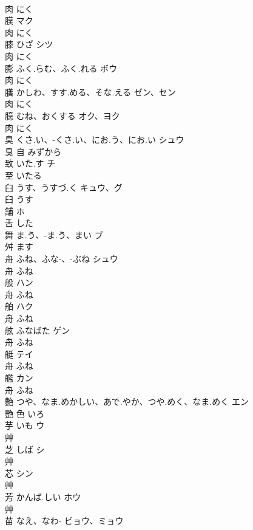 \documentclass[8pt]{extreport}
\begin{document}
\begin{CJK}{UTF8}{min}
\\	肉		にく		
\\	膜		マク	
\\	肉		にく		
\\	膝	ひざ	シツ	
\\	肉		にく		
\\	膨	ふく.らむ、ふく.れる	ボウ	
\\	肉		にく		
\\	膳	かしわ、すす.める、そな.える	ゼン、セン	
\\	肉		にく		
\\	臆	むね、おくする	オク、ヨク	
\\	肉		にく		
\\	臭	くさ.い、-くさ.い、にお.う、にお.い	シュウ	
\\	臭	自		みずから		
\\	致	いた.す	チ	
\\	至		いたる		
\\	臼	うす、うすづ.く	キュウ、グ	
\\	臼		うす		
\\	舗		ホ	
\\	舌		した		
\\	舞	ま.う、-ま.う、まい	ブ	
\\	舛		ます		
\\	舟	ふね、ふな-、-ぶね	シュウ	
\\	舟		ふね		
\\	般		ハン	
\\	舟		ふね		
\\	舶		ハク	
\\	舟		ふね		
\\	舷	ふなばた	ゲン	
\\	舟		ふね		
\\	艇		テイ	
\\	舟		ふね		
\\	艦		カン	
\\	舟		ふね		
\\	艶	つや、なま.めかしい、あで.やか、つや.めく、なま.めく	エン	
\\	艷	色		いろ		
\\	芋	いも	ウ	
\\	艸				
\\	芝	しば	シ	
\\	艸				
\\	芯		シン	
\\	艸				
\\	芳	かんば.しい	ホウ	
\\	艸				
\\	苗	なえ、なわ-	ビョウ、ミョウ	

\end{CJK}
\end{document}
